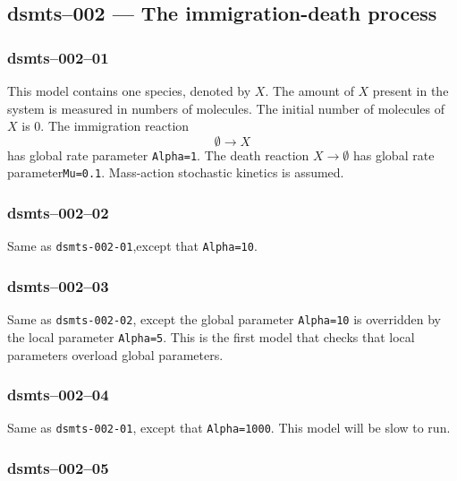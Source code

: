 


\subsection{dsmts--002 --- The immigration-death process}

\subsubsection{dsmts--002--01}

This model contains one species, denoted by $X$. The amount of $X$
present in the system is measured in numbers of molecules. The initial
number of molecules of $X$ is $0$. The immigration reaction
\[
\emptyset \longrightarrow X
\] 
has global rate parameter
\texttt{Alpha=1}. The death reaction $X\longrightarrow \emptyset$ has
global rate parameter\texttt{Mu=0.1}. Mass-action stochastic kinetics
is assumed.


\subsubsection{dsmts--002--02} 

Same as \verb$dsmts-002-01$,except that
\verb$Alpha=10$. 


\subsubsection{dsmts--002--03} 

Same as \verb$dsmts-002-02$, except the global parameter
\verb$Alpha=10$ is overridden by the local parameter
\verb$Alpha=5$. This is the first model that checks that local
parameters overload global parameters.


\subsubsection{dsmts--002--04}

Same as \verb$dsmts-002-01$, except that \verb$Alpha=1000$. This model
will be slow to run.


\subsubsection{dsmts--002--05} 

